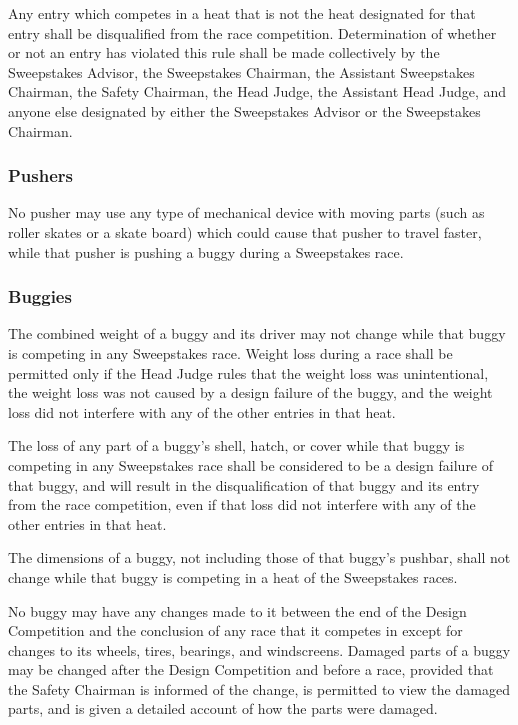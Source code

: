 Any entry which competes in a heat that is not the heat designated for that entry shall be disqualified from the race competition. Determination of whether or not an entry has violated this rule shall be made collectively by the Sweepstakes Advisor, the Sweepstakes Chairman, the Assistant Sweepstakes Chairman, the Safety Chairman, the Head Judge, the Assistant Head Judge, and anyone else designated by either the Sweepstakes Advisor or the Sweepstakes Chairman.

\subsubsection{Pushers}

No pusher may use any type of mechanical device with moving parts (such as roller skates or a skate board) which could cause that pusher to travel faster, while that pusher is pushing a buggy during a Sweepstakes race.

\subsubsection{Buggies}

The combined weight of a buggy and its driver may not change while that buggy is competing in any Sweepstakes race. Weight loss during a race shall be permitted only if the Head Judge rules that the weight loss was unintentional, the weight loss was not caused by a design failure of the buggy, and the weight loss did not interfere with any of the other entries in that heat.

The loss of any part of a buggy's shell, hatch, or cover while that buggy is competing in any Sweepstakes race shall be considered to be a design failure of that buggy, and will result in the disqualification of that buggy and its entry from the race competition, even if that loss did not interfere with any of the other entries in that heat.

The dimensions of a buggy, not including those of that buggy's pushbar, shall not change while that buggy is competing in a heat of the Sweepstakes races.

No buggy may have any changes made to it between the end of the Design Competition and the conclusion of any race that it competes in except for changes to its wheels, tires, bearings, and windscreens. Damaged parts of a buggy may be changed after the Design Competition and before a race, provided that the Safety Chairman is informed of the change, is permitted to view the damaged parts, and is given a detailed account of how the parts were damaged.

